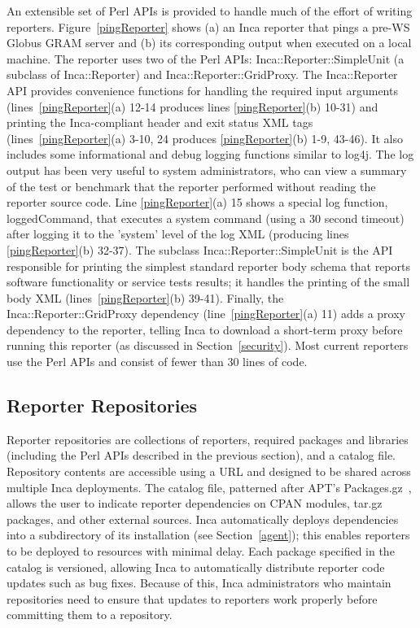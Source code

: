 \documentclass{sig-alternate}
\begin{document}
An extensible set of Perl APIs is provided to handle much of the effort of
writing reporters.  Figure~\ref{pingReporter} shows (a) an Inca reporter that
pings a pre-WS Globus GRAM server and (b) its corresponding output when
executed on a local machine.  The reporter uses two of the Perl APIs:
\linebreak Inca::Reporter::SimpleUnit (a subclass of Inca::Reporter)
\linebreak and
Inca::Reporter::GridProxy.  The Inca::Reporter API provides convenience
functions for handling the required input arguments
(lines~\ref{pingReporter}(a) 12-14 produces lines \ref{pingReporter}(b)
10-31) and printing the Inca-compliant header and exit status XML tags
(lines~\ref{pingReporter}(a) 3-10, 24 produces \ref{pingReporter}(b)
1-9, 43-46).  It also includes some informational and debug logging functions
similar to log4j.  The log output has been very useful to system
administrators, who can view a summary of the test or benchmark that the
reporter performed without reading the reporter source code.  Line
\ref{pingReporter}(a) 15 shows a special log function, loggedCommand, that
executes a system command (using a 30 second timeout) after logging it to the
'system' level of the log XML (producing lines \ref{pingReporter}(b) 32-37).  The subclass
Inca::Reporter::SimpleUnit is the API responsible for printing the simplest
standard reporter body schema that reports software functionality or service
tests results; it handles the printing of the small body XML
(lines~\ref{pingReporter}(b) 39-41).  Finally, the
Inca::Reporter::GridProxy dependency (line~\ref{pingReporter}(a) 11) adds a proxy
dependency to the reporter, telling Inca to download a
short-term proxy before running this reporter (as discussed in
Section~\ref{security}).  Most current reporters use the Perl APIs and consist
of fewer than 30 lines of code.

\subsection{Reporter Repositories}

Reporter repositories are collections of reporters, required
packages and libraries (including the Perl APIs described in the previous
section), and a catalog file.  Repository contents are accessible using a URL
and designed to be shared across multiple Inca deployments.  The catalog file,
patterned after APT's Packages.gz~\cite{apt}, allows the user to indicate
reporter dependencies on CPAN modules, tar.gz packages, and other external
sources.  Inca automatically deploys dependencies into a
subdirectory of its installation (see Section~\ref{agent}); this enables
reporters to be deployed to resources with minimal delay.  Each package
specified in the catalog is versioned, allowing Inca to
automatically distribute reporter code updates such as bug fixes.  Because of
this, Inca administrators who maintain repositories need to ensure
that updates to reporters work properly before committing them to a repository.
\end{document}
